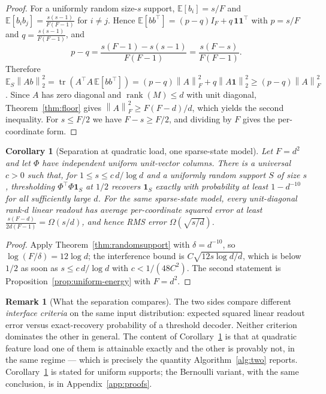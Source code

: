 \documentclass[preprint,12pt]{elsarticle}
\newtheorem{corollary}[theorem]{Corollary}
\theoremstyle{definition}
\newtheorem{remark}[theorem]{Remark}
\newcommand{\E}{\mathbb{E}}
\newcommand{\norm}[1]{\left\lVert #1 \right\rVert}
\begin{document}
\begin{proof}
For a uniformly random size-$s$ support, $\E[b_i]=s/F$ and $\E[b_ib_j]=\frac{s(s-1)}{F(F-1)}$
for $i\neq j$. Hence $\E[bb^{\top}]=(p-q)I_F+q\,\mathbf 1\mathbf 1^{\top}$ with $p=s/F$ and
$q=\frac{s(s-1)}{F(F-1)}$, and
\[
  p-q=\frac{s(F-1)-s(s-1)}{F(F-1)}=\frac{s(F-s)}{F(F-1)} .
\]
Therefore
$\E_S\norm{Ab}_2^2=\operatorname{tr}(A^{\top}A\,\E[bb^{\top}])
=(p-q)\norm{A}_F^2+q\norm{A\mathbf 1}_2^2\ge(p-q)\norm{A}_F^2$.
Since $A$ has zero diagonal and $\operatorname{rank}(M)\le d$ with unit diagonal,
Theorem~\ref{thm:floor} gives $\norm{A}_F^2\ge F(F-d)/d$, which yields the second inequality.
For $s\le F/2$ we have $F-s\ge F/2$, and dividing by $F$ gives the per-coordinate form.
\end{proof}

\begin{corollary}[Separation at quadratic load, one sparse-state model]
\label{cor:separation}
Let $F=d^2$ and let $\Phi$ have independent uniform unit-vector columns. There is a universal
$c>0$ such that, for $1\le s\le c\,d/\log d$ and a uniformly random support $S$ of size $s$,
thresholding $\Phi^{\top}\Phi\mathbf 1_S$ at $1/2$ recovers $\mathbf 1_S$ exactly with
probability at least $1-d^{-10}$ for all sufficiently large $d$. For the \emph{same} sparse-state
model, every unit-diagonal rank-$d$ linear readout has average per-coordinate squared error at
least $\frac{s(F-d)}{2d(F-1)}=\Omega(s/d)$, and hence RMS error $\Omega(\sqrt{s/d})$.
\end{corollary}

\begin{proof}
Apply Theorem~\ref{thm:randomsupport} with $\delta=d^{-10}$, so $\log(F/\delta)=12\log d$; the
interference bound is $C\sqrt{12s\log d/d}$, which is below $1/2$ as soon as
$s\le c\,d/\log d$ with $c<1/(48C^2)$. The second statement is
Proposition~\ref{prop:uniform-energy} with $F=d^2$.
\end{proof}

\begin{remark}[What the separation compares]
\label{rem:criteria}
The two sides compare different \emph{interface criteria} on the same input distribution:
expected squared linear readout error versus exact-recovery probability of a threshold
decoder. Neither criterion dominates the other in general. The content of
Corollary~\ref{cor:separation} is that at quadratic feature load one of them is attainable
exactly and the other is provably not, in the same regime --- which is precisely the quantity
Algorithm~\ref{alg:two} reports. Corollary~\ref{cor:separation} is stated for uniform supports;
the Bernoulli variant, with the same conclusion, is in Appendix~\ref{app:proofs}.
\end{remark}
\end{document}
